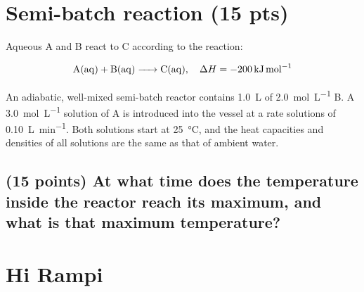 \documentclass[11pt]{article}
\begin{document}
\section{Semi-batch reaction (15 pts)}
\label{sec-5}
Aqueous A and B react to C according to the reaction:

\[\ce{A (aq) + B (aq) -> C (aq)},\quad\Delta H = \SI{-200}{\kilo\joule\per\mole}\]

\noindent An adiabatic, well-mixed semi-batch reactor contains \SI{1.0}{\liter}
of \SI{2.0}{\mole\per\liter} B.  A \SI{3.0}{\mole\per\liter} solution of A is
introduced into the vessel at a rate solutions of \SI{0.10}{\liter\per\minute}.
Both solutions start at \SI{25}{\celsius}, and the heat capacities and densities of all solutions are the same as that of ambient water.

\subsection{(15 points) At what time does the temperature inside the reactor reach its maximum, and what is that maximum temperature?}
\label{sec-5-1}
\section{Hi Rampi}
\label{sec-6}
\end{document}

